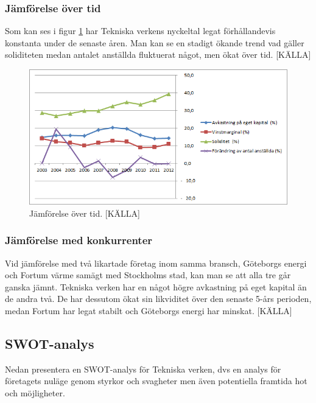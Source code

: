 \documentclass[10pt,a4paper]{article}
\begin{document}
\subsubsection{Jämförelse över tid} 
Som kan ses i figur \ref{fig:jamfor} har Tekniska verkens nyckeltal legat
förhållandevis konstanta under de senaste åren. Man kan se en stadigt ökande trend vad gäller soliditeten medan antalet anställda fluktuerat något, men ökat över tid. [KÄLLA]
\begin{figure}[H] 
\centerline{\includegraphics[scale=0.8]{Bilder/jamforelse_over_tid.png}}
\caption{Jämförelse över tid. [KÄLLA]}
\label{fig:jamfor}
\end{figure}  

\subsubsection{Jämförelse med konkurrenter}
Vid jämförelse med två likartade företag inom samma bransch, Göteborgs
energi och Fortum värme samägt med Stockholms stad, kan man se att
alla tre går ganska jämnt. Tekniska verken har en något högre
avkastning på eget kapital än de andra två. De har dessutom ökat sin
likviditet över den senaste 5-års perioden, medan Fortum har legat
stabilt och Göteborgs energi har minskat. [KÄLLA]


\subsection{SWOT-analys}
Nedan presentera en SWOT-analys för Tekniska verken, dvs en analys för företagets nuläge genom styrkor och svagheter men även potentiella framtida hot och möjligheter. 
\end{document}
